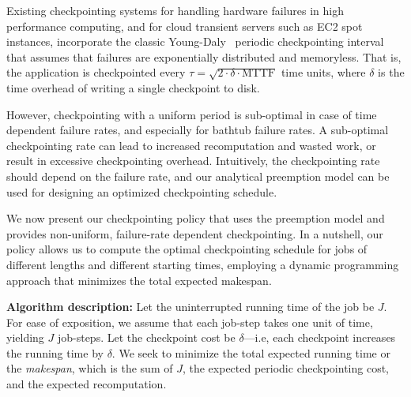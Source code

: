 Existing checkpointing systems for handling hardware failures in high performance computing, and for cloud transient servers such as EC2 spot instances, incorporate the classic Young-Daly~\cite{dongarra_fault_nodate, daly2006higher, flint, marathe2014exploiting} periodic checkpointing interval that assumes that failures are exponentially distributed and memoryless.  
That is, the application is checkpointed every $\tau = \sqrt{2 \cdot \delta \cdot \text{MTTF}}$ time units, where $\delta$ is the time overhead of writing a single checkpoint to disk. 


However, checkpointing with a uniform period is sub-optimal in case of time dependent failure rates, and especially for bathtub failure rates. 
A sub-optimal checkpointing rate can lead to increased recomputation and wasted work, or result in excessive checkpointing overhead. 
Intuitively, the checkpointing rate should depend on the failure rate, and our analytical preemption model can be used for designing an optimized checkpointing schedule.

We now present our checkpointing policy that uses the preemption model and provides non-uniform, failure-rate dependent checkpointing.
In a nutshell, our policy allows us to compute the optimal checkpointing schedule for jobs of different lengths and different starting times, employing a dynamic programming approach that minimizes the total expected makespan. 


\noindent \textbf{Algorithm description:}
Let the uninterrupted running time of the job be $J$.
For ease of exposition, we assume that each job-step takes one unit of time, yielding $J$ job-steps. 
Let the checkpoint cost be $\delta$---i.e, each checkpoint increases the running time by $\delta$. 
We seek to minimize the total expected running time or the \emph{makespan}, which is the sum of $J$, the expected periodic checkpointing cost, and the expected recomputation. 

